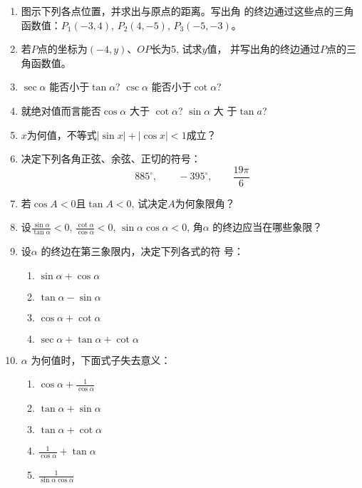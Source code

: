 \begin{ex}
\begin{enumerate}
    \item 图示下列各点位置，并求出与原点的距离。写出角
的终边通过这些点的三角函数值：$P_1(-3,4)$, $P_2(4,-5)$,
$P_3(-5,-3)$。
\item 若$P$点的坐标为$(-4,y)$、$OP$长为5, 试求$y$值，
并写出角的终边通过$P$点的三角函数值。
\item $\sec\alpha$ 能否小于$\tan \alpha$? $\csc\alpha$ 能否小于$\cot\alpha$?
\item 就绝对值而言能否$\cos\alpha$  大于 
$\cot\alpha$? $\sin\alpha$ 大
于$\tan a$?
\item $x$为何值，不等式$|\sin x|+|\cos x|<1$成立？
\item 决定下列各角正弦、余弦、正切的符号：
\[885^{\circ},\qquad -395^{\circ},\qquad \frac{19\pi}{6}\]
\item 若$\cos A<0$且$\tan A<0$, 试决定$A$为何象限角？
\item 设$\frac{\sin\alpha}{\tan\alpha}<0$, $\frac{\cot\alpha}{\cos\alpha}<0$, $\sin\alpha \cos\alpha <0$, 角$\alpha$ 的终边应当在哪些象限？
\item 设$\alpha$ 的终边在第三象限内，决定下列各式的符
号：
\begin{multicols}{2}
\begin{enumerate}
    \item $\sin\alpha  +\cos\alpha$
    \item $\tan \alpha-\sin\alpha$
    \item $\cos\alpha +\cot \alpha$
    \item $\sec\alpha  +\tan \alpha  +\cot \alpha$
\end{enumerate}    
\end{multicols}

\item $\alpha$ 为何值时，下面式子失去意义：
\begin{multicols}{2}
\begin{enumerate}
    \item $\cos\alpha  +\frac{1}{\cos\alpha}$
    \item $\tan \alpha+\sin\alpha$
    \item  $\tan \alpha+\cot\alpha$
    \item $\frac{1}{\cos\alpha} +\tan \alpha$
    \item $\frac{1}{\sin\alpha\cos\alpha}$
\end{enumerate}    
\end{multicols}
\end{enumerate}
\end{ex}

